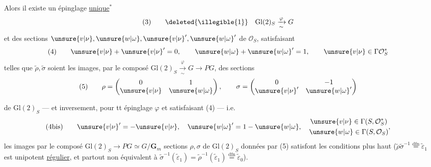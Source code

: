 Alors il existe un épinglage \uline{unique}$^*$
\[
(3)\qquad\deleted{\illegible{1}}\quad\mathrm{Gl}(2)_S\xrightarrow[\sim]{\varphi}G
\]
et des sections $\unsure{v|\nu},\unsure{w|\omega},\unsure{v|\nu}',\unsure{w|\omega}'$ de $\mathcal O_S$, satisfaisant
\[
(4)\qquad \unsure{v|\nu}+\unsure{v|\nu}'=0,\qquad \unsure{w|\omega}+\unsure{w|\omega}'=1,\qquad \unsure{v|\nu}\in\Gamma\mathcal O_S^*
\]
telles que $\widetilde\rho,\widetilde\sigma$ soient les images, par le composé $\mathrm{Gl}(2)_S\xrightarrow[\sim]{\varphi}G\longrightarrow PG$, des sections
\[
(5)\qquad \rho=\begin{pmatrix}0&1\\\unsure{v|\nu}&\unsure{w|\omega}\end{pmatrix},\qquad
\sigma=\begin{pmatrix}0&-1\\\unsure{v|\nu}'&\unsure{w|\omega}'\end{pmatrix}
\]

de $\mathrm{Gl}(2)_S$ --- et inversement, pour tt épinglage $\varphi$ et   satisfaisant (4) --- i.e.
\[
(4\mathrm{bis})\qquad \unsure{v|\nu}'=-\unsure{v|\nu},\quad \unsure{w|\omega}'=1-\unsure{w|\omega},\quad\begin{gathered}\unsure{v|\nu}\in\Gamma(S,\mathcal O_S^*)\\\unsure{w|\omega}\in\Gamma(S,\mathcal O_S)\end{gathered},
\]
les images \inserted{$\widetilde\rho,\widetilde\sigma$} par le composé $\mathrm{Gl}(2)_S\longrightarrow PG\simeq G/\mathbf G_m$  sections $\rho,\sigma$ de $\mathrm{Gl}(2)_S$ données par (5) satisfont les conditions plus haut ($\widetilde\rho\widetilde\sigma^{-1}\overset{\mathrm{dfn}}=\widetilde\varepsilon_1$ est unipotent \uline{régulier}, et partout non équivalent à $\widetilde\sigma^{-1}(\widetilde\varepsilon_1)=\widetilde\rho^{-1}(\widetilde\varepsilon_1)\overset{\mathrm{dfn}}=\widetilde\varepsilon_0$).

